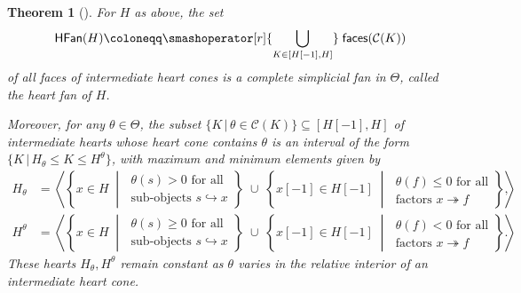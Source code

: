 \documentclass[reqno,a4paper]{amsart}
\newcommand{\calC}{\mathcal{C}}
\theoremstyle{basic-theorem}
\newtheorem{theorem}{Theorem}[section]
\numberwithin{equation}{section}
\begin{document}
\begin{theorem}[{\cite[Theorem~A, Corollary~3.3]{HeartFan}}]
    For $H$ as above, the set
	\begin{align}
		\mathsf{HFan}(H)\coloneqq \smashoperator[r]{\bigcup_{K\in [H[-1],H]}}\; \mathsf{faces}(\calC(K))
	\end{align}
    of all faces of intermediate heart cones is a complete simplicial fan in $\Theta$, called the \textit{heart fan of $H$}.

    Moreover, for any $\theta\in \Theta$, the subset $\{K\,\vert\, \theta\in \calC(K)\}\subseteq  [H[-1],H]$ of intermediate hearts whose heart cone contains $\theta$ is an \textit{interval} of the form $\{K\,\vert\, H_\theta\leq K\leq H^\theta\}$, with maximum and minimum elements given by
    \begin{align}
        H_\theta &=
        \left\langle
                \left\{ x\in H
                    \;\middle\vert\; \begin{array}{l}\theta(s)>0 \text{ for all}\\
                \text{sub-objects }s\hookrightarrow x\end{array}
                \right\} \;\cup\;
                \left\{ x[-1]\in H[-1]
                    \;\middle\vert\; \begin{array}{l}\theta(f)\leq 0 \text{ for all}\\
                \text{factors }x\twoheadrightarrow f\end{array}
                \right\}
        \right\rangle\ ,\\[6pt]
        H^\theta &=
        \left\langle
                \left\{ x\in H
                    \;\middle\vert\; \begin{array}{l}\theta(s)\geq 0 \text{ for all}\\
                \text{sub-objects }s\hookrightarrow x\end{array}
                \right\} \;\cup\;
                \left\{ x[-1]\in H[-1]
                    \;\middle\vert\; \begin{array}{l}\theta(f) < 0 \text{ for all}\\
                \text{factors }x\twoheadrightarrow f\end{array}
                \right\}
        \right\rangle\ .
    \end{align}
    These hearts $H_\theta,H^\theta$ remain constant as $\theta$ varies in the relative interior of an intermediate heart cone.
\end{theorem}
\end{document}
